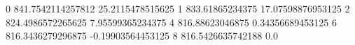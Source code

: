 0 841.7542114257812 25.2115478515625
1 833.61865234375 17.07598876953125
2 824.4986572265625 7.95599365234375
4 816.88623046875 0.34356689453125
6 816.3436279296875 -0.19903564453125
8 816.5426635742188 0.0
